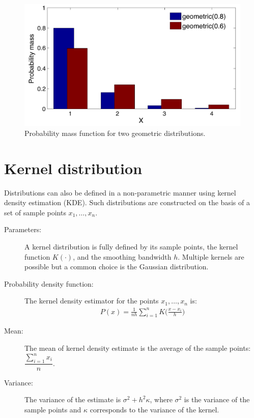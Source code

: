 \begin{figure}[t]
\centering
\includegraphics[scale=0.40]{imgs/geometric_appendix.pdf}  \vspace{-2mm}
\caption{Probability mass function for two geometric distributions. } 
\label{fig:geometric-appendix}
\end{figure}



\section*{Kernel distribution}

Distributions can also be defined in a non-parametric manner using kernel density estimation (KDE).  Such distributions are constructed on the basis of a set of sample points $x_1, \dots, x_n$.

\begin{description}
\item [Parameters: ] A kernel distribution is fully defined by its sample points, the kernel function $K(\cdot)$, and the smoothing bandwidth $h$.  Multiple kernels are possible but a common choice is the Gaussian distribution.

\item [Probability density function: ] The kernel density estimator for the points $x_1, \dots, x_n$ is: 
\begin{align}
P(x) = \frac{1}{nh} \sum_{i=1}^n K\Big(\frac{x-x_i}{h}\Big)
\end{align}
\item [Mean: ] The mean of kernel density estimate is the average of the sample points: $\dfrac{\sum_{i=1}^n x_i}{n}$.

\item [Variance: ] The variance of the estimate is $\sigma^2 + h^2 \kappa$, where $\sigma^2$ is the variance of the sample points and $\kappa$ corresponds to the variance of the kernel. 

\end{description}

